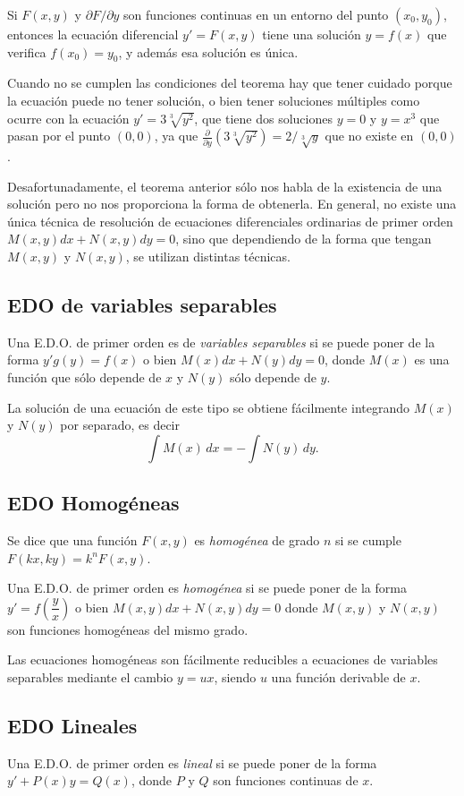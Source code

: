 \begin{teoremasn}
Si $F(x,y)$ y $\partial F/\partial y$ son funciones continuas en un entorno del punto $(x_0,y_0)$, entonces la ecuación
diferencial $y'=F(x,y)$ tiene una solución $y=f(x)$ que verifica $f(x_0)=y_0$, y además esa solución es única.
\end{teoremasn}
Cuando no se cumplen las condiciones del teorema hay que tener cuidado porque la ecuación puede no tener solución, o
bien tener soluciones múltiples como ocurre con la ecuación $y'=3\sqrt[3]{y^2}$, que tiene dos soluciones $y=0$ y
$y=x^3$ que pasan por el punto $(0,0)$, ya que $\frac{\partial}{\partial y}(3\sqrt[3]{y^2})=2/\sqrt[3]{y}$ que no existe
en $(0,0)$.

Desafortunadamente, el teorema anterior sólo nos habla de la existencia de una solución pero no nos proporciona la forma
de obtenerla. 
En general, no existe una única técnica de resolución de ecuaciones diferenciales ordinarias de primer orden
$M(x,y)dx+N(x,y)dy=0$, sino que dependiendo de la forma que tengan $M(x,y)$ y $N(x,y)$, se utilizan distintas técnicas.


\subsection{EDO de variables separables}
Una E.D.O. de primer orden es de \emph{variables separables} si se puede poner de la forma $y'g(y)=f(x)$ o bien
$M(x)dx+N(y)dy=0$, donde $M(x)$ es una función que sólo depende de $x$ y $N(y)$ sólo depende de $y$.

La solución de una ecuación de este tipo se obtiene fácilmente integrando $M(x)$ y $N(y)$ por separado, es decir
\[
\int M(x)\,dx=-\int N(y)\,dy.
\]

\subsection{EDO Homogéneas}
Se dice que una función $F(x,y)$ es \emph{homogénea} de grado $n$ si se cumple $F(kx,ky)=k^nF(x,y)$.

Una E.D.O. de primer orden es \emph{homogénea} si se puede poner de la forma
$y'=f\left(\dfrac{y}{x}\right)$ o bien $M(x,y)dx+N(x,y)dy=0$ donde $M(x,y)$ y $N(x,y)$ son funciones homogéneas del mismo grado.

Las ecuaciones homogéneas son fácilmente reducibles a ecuaciones de variables separables mediante el cambio $y=ux$,
siendo $u$ una función derivable de $x$.

\subsection{EDO Lineales}
Una E.D.O. de primer orden es \emph{lineal} si se puede poner de la forma $y'+ P(x)y = Q(x)$, donde $P$ y $Q$ son
funciones continuas de $x$.


